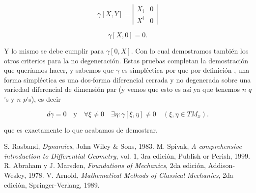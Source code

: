 \documentclass[a4paper,10pt]{article}
\numberwithin{equation}{section}
\begin{document}
\begin{equation}
 \gamma[X,Y] = \left|\begin{matrix}
                X_i & 0 \\
                X^i & 0
               \end{matrix}\right|
\end{equation}

\begin{equation}
 \gamma[X,0] = 0.
\end{equation}

Y lo mismo se debe cumplir para $\gamma[0,X]$. Con lo cual demostramos también los otros 
criterios para la no degeneración. Estas pruebas completan la demostración que queríamos 
hacer, y sabemos que $\gamma$ es simpléctica por que por definición \cite{rasband,abraham,arnold},
una forma simpléctica es una dos-forma diferencial cerrada y no degenerada sobre 
una variedad diferencial de dimensión par (y vemos que esto es así ya que tenemos 
$n$ $q$'s y $n$ $p$'s), es decir 

\begin{equation}
 d\gamma = 0 \quad \text{y} \quad \forall \xi \ne 0 \quad \exists \eta: \gamma[\xi,\eta] \ne 0 
 \quad (\xi,\eta \in TM_x).
\end{equation}

que es exactamente lo que acabamos de demostrar.


\begin{thebibliography}{10}
S. Rasband, \emph{Dynamics}, John Wiley \& Sons, 1983.
M. Spivak, \emph{A comprehensive introduction to Differential Geometry}, vol. 1, 
3ra edición, Publish or Perish, 1999.
 R. Abraham y J. Marsden, \emph{Foundations of Mechanics}, 2da edición, Addison-Wesley,
 1978.
V. Arnold, \emph{Mathematical Methods of Classical Mechanics}, 2da edición, Springer-Verlang, 
1989.
 
\end{thebibliography}
\end{document}

